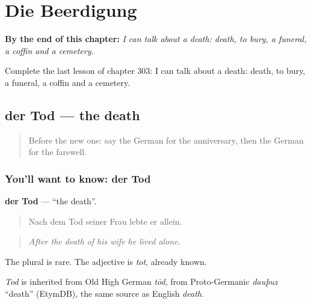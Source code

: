 
\chapter{Die Beerdigung}
\label{ch:ge-die-beerdigung}

\begin{chapteropening}
\textbf{By the end of this chapter:} \emph{I can talk about a death: death, to bury, a funeral, a coffin and a cemetery.}

Complete the last lesson of chapter 303: I can talk about a death: death, to bury, a funeral, a coffin and a cemetery.
\end{chapteropening}

\section[der Tod]{der Tod — the death}

\label{lesson:GE-C303-tod}



\begin{quote}
Before the new one: say the German for the anniversary, then the German for the farewell.
\end{quote}

\subsection*{You'll want to know: der Tod}
\textbf{der Tod} — \textquotedblleft{}the death\textquotedblright{}.

\begin{quote}
Nach dem Tod seiner Frau lebte er allein.
\end{quote}

\begin{quote}
\emph{After the death of his wife he lived alone.}
\end{quote}

The plural is rare. The adjective is \emph{tot}, already known.

\begin{cousinweb}
\emph{Tod} is inherited from Old High German \emph{tōd}, from Proto-Germanic \emph{dauþuz} \textquotedblleft{}death\textquotedblright{} (EtymDB), the same source as English \emph{death}.
\end{cousinweb}

